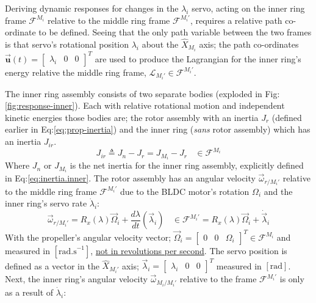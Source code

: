 \par
Deriving dynamic responses for changes in the $\lambda_i$ servo, acting on the inner ring frame $\mathcal{F}^{M_i}$ relative to the middle ring frame $\mathcal{F}^{M_i'}$, requires a relative path co-ordinate to be defined. Seeing that the only path variable between the two frames is that servo's rotational position $\lambda_i$ about the $\hat{X}_{M_i}$ axis; the path co-ordinates $\vec{\mathbf{u}}(t)=\begin{bmatrix}\lambda_i&0&0\end{bmatrix}^T$ are used to produce the Lagrangian for the inner ring's energy relative the middle ring frame, $\mathcal{L}_{M_i'}\in\mathcal{F}^{M_i'}$.
\par
The inner ring assembly consists of two separate bodies (exploded in Fig:\ref{fig:response-inner}). Each with relative rotational motion and independent kinetic energies those bodies are; the rotor assembly with an inertia $J_{r}$ (defined earlier in Eq:\ref{eq:prop-inertia}) and the inner ring (\emph{sans} rotor assembly) which has an inertia $J_{ir}$.
\begin{equation}
J_{ir}\triangleq J_{n}-J_{r}=J_{M_i}-J_{r}~~~~\in\mathcal{F}^{M_i}
\end{equation} 
Where $J_n$ or $J_{M_i}$ is the net inertia for the inner ring assembly, explicitly defined in Eq:\ref{eq:inertia.inner}. The rotor assembly has an angular velocity $\vec{\omega}_{r/M_i'}$ relative to the middle ring frame $\mathcal{F}^{M_i'}$ due to the BLDC motor's rotation $\Omega_i$ and the inner ring's servo rate $\dot{\lambda}_i$:
\begin{subequations}\label{eq:angular-rot}
\begin{equation}
\vec{\omega}_{r/M_i'}=R_x(\lambda)\vec{\Omega}_i+\frac{d\lambda}{dt}(\vec{\lambda}_i)~~~~\in\mathcal{F}^{M_i'}
\end{equation}
\begin{equation}
=R_x(\lambda)\vec{\Omega}_i+\dot{\vec{\lambda}}_i
\end{equation}
\end{subequations}
With the propeller's angular velocity vector; $\vec{\Omega}_i=\begin{bmatrix}0 & 0 & \Omega_i\end{bmatrix}^T\in\mathcal{F}^{M_i}$ and measured in $[\text{rad.s}^{-1}]$, \underline{not in revolutions per second}. The servo position is defined as a vector in the $\hat{X}_{M_i'}$ axis; $\vec{\lambda}_i=\begin{bmatrix}\lambda_i & 0 & 0\end{bmatrix}^T$ measured in $[\text{rad}]$. Next, the inner ring's angular velocity $\vec{\omega}_{M_i/M_i'}$ relative to the frame $\mathcal{F}^{M_i'}$ is only as a result of $\dot{\lambda}_i$:
